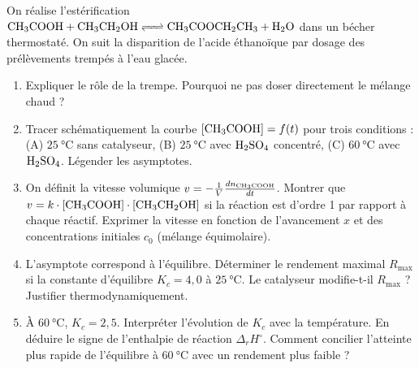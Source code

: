 \documentclass[11pt]{article}
\begin{document}
\begin{exercice}
On réalise l'estérification $\ce{CH3COOH + CH3CH2OH <=> CH3COOCH2CH3 + H2O}$ dans un bécher thermostaté. On suit la disparition de l'acide éthanoïque par dosage des prélèvements trempés à l'eau glacée.
\begin{enumerate}
    \item Expliquer le rôle de la trempe. Pourquoi ne pas doser directement le mélange chaud ?
    \item Tracer schématiquement la courbe $[\ce{CH3COOH}] = f(t)$ pour trois conditions : (A) $\SI{25}{\celsius}$ sans catalyseur, (B) $\SI{25}{\celsius}$ avec $\ce{H2SO4}$ concentré, (C) $\SI{60}{\celsius}$ avec $\ce{H2SO4}$. Légender les asymptotes.
    \item On définit la vitesse volumique $v = -\frac{1}{V}\frac{dn_{\ce{CH3COOH}}}{dt}$. Montrer que $v = k \cdot [\ce{CH3COOH}] \cdot [\ce{CH3CH2OH}]$ si la réaction est d'ordre 1 par rapport à chaque réactif. Exprimer la vitesse en fonction de l'avancement $x$ et des concentrations initiales $c_0$ (mélange équimolaire).
    \item L'asymptote correspond à l'équilibre. Déterminer le rendement maximal $R_{\text{max}}$ si la constante d'équilibre $K_c = 4,0$ à $\SI{25}{\celsius}$. Le catalyseur modifie-t-il $R_{\text{max}}$ ? Justifier thermodynamiquement.
    \item À $\SI{60}{\celsius}$, $K_c = 2,5$. Interpréter l'évolution de $K_c$ avec la température. En déduire le signe de l'enthalpie de réaction $\Delta_r H^\circ$. Comment concilier l'atteinte plus rapide de l'équilibre à $\SI{60}{\celsius}$ avec un rendement plus faible ?
\end{enumerate}
\end{exercice}
\end{document}
